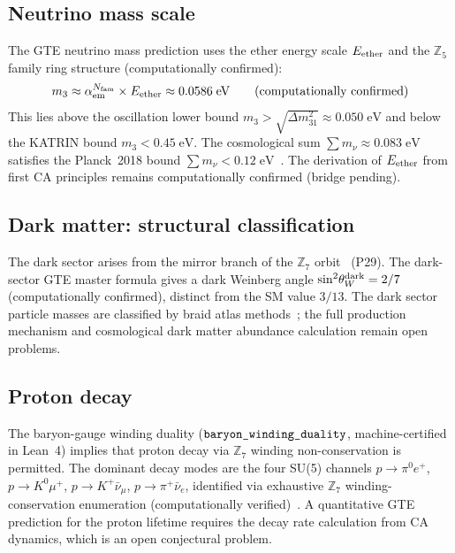 \documentclass[11pt]{article}
\theoremstyle{remark}
\newcommand{\ZS}{\mathbb{Z}_7}
\newcommand{\Zfive}{\mathbb{Z}_5}
\newcommand{\Nfam}{N_{\rm fam}}
\newcommand{\lean}[1]{%
  \penalty-100
  \begingroup\def\_{\textunderscore\allowbreak}\texttt{#1}\endgroup}
\newcommand{\sinwsq}{\sin^2\!\theta_W}
\begin{document}
\subsection{Neutrino mass scale}
\label{sec:neutrino}

The GTE neutrino mass prediction uses the ether energy scale $E_{\rm ether}$ and
the $\Zfive$ family ring structure (computationally confirmed):
\begin{equation}
  m_3 \approx \alpha_{\rm em}^{\Nfam} \times E_{\rm ether} \approx 0.0586\;\text{eV}
  \qquad (\text{computationally confirmed})
\end{equation}
This lies above the oscillation lower bound $m_3 > \sqrt{\Delta m^2_{31}} \approx 0.050\;\text{eV}$
and below the KATRIN bound $m_3 < 0.45\;\text{eV}$.
The cosmological sum $\sum m_\nu \approx 0.083\;\text{eV}$ satisfies the Planck~2018
bound $\sum m_\nu < 0.12\;\text{eV}$~\cite{Planck2018Params}.
The derivation of $E_{\rm ether}$ from first CA principles remains computationally confirmed (bridge pending).

\subsection{Dark matter: structural classification}
\label{sec:dark}

The dark sector arises from the mirror branch of the $\ZS$ orbit~\cite{SpivackMirrorBraidAtlas}
(P29). The dark-sector GTE master formula gives a dark Weinberg angle
$\sinwsq^{\rm dark} = 2/7$ (computationally confirmed), distinct from the SM value $3/13$.
The dark sector particle masses are classified by braid atlas methods~\cite{SpivackMirrorBraidAtlas};
the full production mechanism and cosmological dark matter abundance calculation
remain open problems.

\subsection{Proton decay}

The baryon-gauge winding duality ($\lean{baryon\_winding\_duality}$, machine-certified in Lean~4)
implies that proton decay via $\ZS$ winding non-conservation is permitted.
The dominant decay modes are the four SU(5) channels
$p \to \pi^0 e^+$, $p \to K^0 \mu^+$, $p \to K^+ \bar\nu_\mu$,
$p \to \pi^+ \bar\nu_e$, identified via exhaustive $\ZS$ winding-conservation enumeration
(computationally verified)~\cite{SpivackDeeperConsequences}.
A quantitative GTE prediction for the proton lifetime requires the decay rate calculation
from CA dynamics, which is an open conjectural problem.
\end{document}
